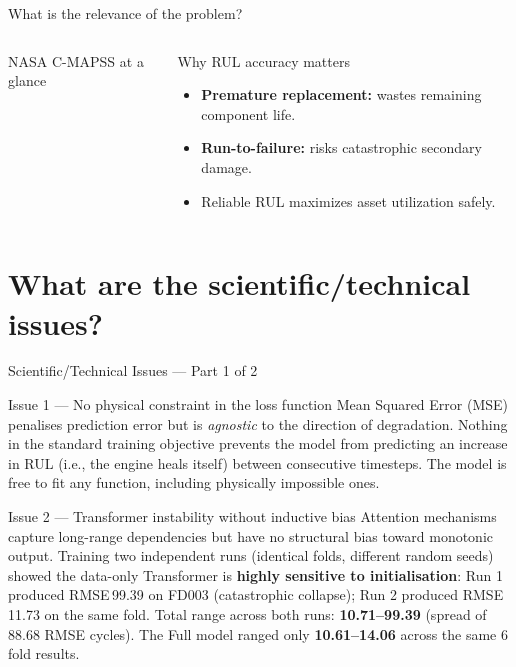 \documentclass[10pt, aspectratio=169, handout]{beamer}
\begin{document}
\begin{frame}{What is the relevance of the problem?}
\begin{columns}[T]
\begin{block}{NASA C-MAPSS at a glance}
      \end{block}
      \vspace{8pt}
      \begin{block}{Why RUL accuracy matters}
        \small
        \begin{itemize}
          \item \textbf{Premature replacement:} wastes remaining component life.
          \item \textbf{Run-to-failure:} risks catastrophic secondary damage.
          \item Reliable RUL maximizes asset utilization safely.
        \end{itemize}
      \end{block}
  \end{columns}
\end{frame}

\section{What are the scientific/technical issues?}

\begin{frame}{Scientific/Technical Issues --- Part 1 of 2}
  \begin{block}{Issue 1 --- No physical constraint in the loss function}
    \small
    Mean Squared Error (MSE) penalises prediction error but is \emph{agnostic} to the
    direction of degradation.  Nothing in the standard training objective prevents the
    model from predicting an increase in RUL (i.e., the engine heals itself) between
    consecutive timesteps.  The model is free to fit any function, including physically
    impossible ones.
  \end{block}
  \vspace{10pt}
  \begin{block}{Issue 2 --- Transformer instability without inductive bias}
    \small
    Attention mechanisms capture long-range dependencies but have no structural bias toward
    monotonic output.  Training two independent runs (identical folds, different random seeds)
    showed the data-only Transformer is \textbf{highly sensitive to initialisation}:
    Run 1 produced RMSE\,99.39 on FD003 (catastrophic collapse);
    Run 2 produced RMSE\,11.73 on the same fold.
    Total range across both runs: \textbf{10.71--99.39} (spread of 88.68 RMSE cycles).
    The Full model ranged only \textbf{10.61--14.06} across the same 6 fold results.
  \end{block}
\end{frame}
\end{document}
